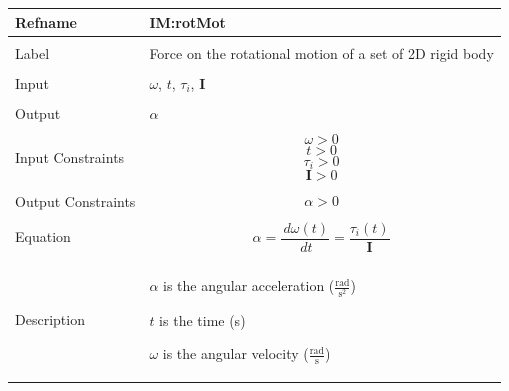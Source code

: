 \documentclass[12pt]{article}
\begin{document}
\noindent \begin{minipage}{\textwidth}
\begin{tabular}{>{\raggedright}p{}>{\raggedright\arraybackslash}p{}}
\toprule \textbf{Refname} & \textbf{IM:rotMot}
\label{IM:rotMot}
\\ \midrule \\
Label & Force on the rotational motion of a set of 2D rigid body
\\ \midrule \\
Input & $ω$, $t$, ${τ_{i}}$, $\mathbf{I}$
\\ \midrule \\
Output & $α$
\\ \midrule \\
Input Constraints & \begin{displaymath}
                    ω>0
                    \end{displaymath}
                    \begin{displaymath}
                    t>0
                    \end{displaymath}
                    \begin{displaymath}
                    {τ_{i}}>0
                    \end{displaymath}
                    \begin{displaymath}
                    \mathbf{I}>0
                    \end{displaymath}
\\ \midrule \\
Output Constraints & \begin{displaymath}
                     α>0
                     \end{displaymath}
\\ \midrule \\
Equation & \begin{displaymath}
           α=\frac{\,dω\left(t\right)}{\,dt}=\frac{{τ_{i}}\left(t\right)}{\mathbf{I}}
           \end{displaymath}
\\ \midrule \\
Description & \begin{symbDescription}
              \item{$α$ is the angular acceleration ($\frac{\text{rad}}{\text{s}^{2}}$)}
              \item{$t$ is the time (s)}
              \item{$ω$ is the angular velocity ($\frac{\text{rad}}{\text{s}}$)}

\end{symbDescription}
\end{tabular}
\end{minipage}
\end{document}
